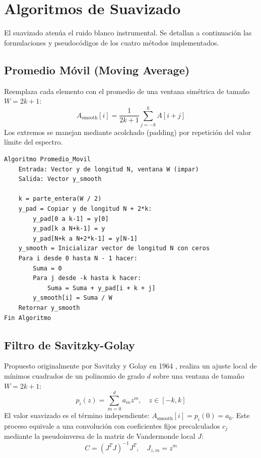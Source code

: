 \documentclass[a4paper,11pt]{article}
\begin{document}
\section{Algoritmos de Suavizado}

El suavizado atenúa el ruido blanco instrumental. Se detallan a continuación las formulaciones y pseudocódigos de los cuatro métodos implementados.

\subsection{Promedio Móvil (Moving Average)}
Reemplaza cada elemento con el promedio de una ventana simétrica de tamaño $W = 2k + 1$:
\begin{equation}
    A_{\text{smooth}}[i] = \frac{1}{2k + 1} \sum_{j=-k}^{k} A[i + j]
\end{equation}
Los extremos se manejan mediante acolchado (padding) por repetición del valor límite del espectro.

\begin{lstlisting}[caption=Algoritmo de Promedio Móvil]
Algoritmo Promedio_Movil
    Entrada: Vector y de longitud N, ventana W (impar)
    Salida: Vector y_smooth

    k = parte_entera(W / 2)
    y_pad = Copiar y de longitud N + 2*k:
        y_pad[0 a k-1] = y[0]
        y_pad[k a N+k-1] = y
        y_pad[N+k a N+2*k-1] = y[N-1]
    y_smooth = Inicializar vector de longitud N con ceros
    Para i desde 0 hasta N - 1 hacer:
        Suma = 0
        Para j desde -k hasta k hacer:
            Suma = Suma + y_pad[i + k + j]
        y_smooth[i] = Suma / W
    Retornar y_smooth
Fin Algoritmo
\end{lstlisting}

\subsection{Filtro de Savitzky-Golay}
Propuesto originalmente por Savitzky y Golay en 1964 \cite{savitzky1964}, realiza un ajuste local de mínimos cuadrados de un polinomio de grado $d$ sobre una ventana de tamaño $W = 2k + 1$:
\begin{equation}
    p_i(z) = \sum_{m=0}^{d} a_m z^m, \quad z \in [-k, k]
\end{equation}
El valor suavizado es el término independiente: $A_{\text{smooth}}[i] = p_i(0) = a_0$. Este proceso equivale a una convolución con coeficientes fijos precalculados $c_j$ mediante la pseudoinversa de la matriz de Vandermonde local $J$:
\begin{equation}
    C = (J^T J)^{-1} J^T, \quad J_{z, m} = z^m
\end{equation}
\end{document}
